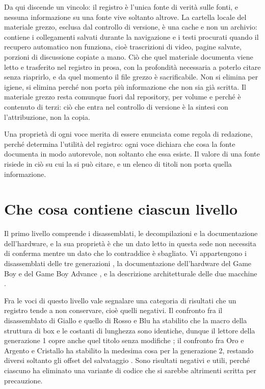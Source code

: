 Da qui discende un vincolo: il registro è l'unica fonte di verità sulle fonti, e nessuna informazione su una fonte vive soltanto altrove. La cartella locale del materiale grezzo, esclusa dal controllo di versione, è una cache e non un archivio: contiene i collegamenti salvati durante la navigazione e i testi procurati quando il recupero automatico non funziona, cioè trascrizioni di video, pagine salvate, porzioni di discussione copiate a mano. Ciò che quel materiale documenta viene letto e trasferito nel registro in prosa, con la profondità necessaria a poterlo citare senza riaprirlo, e da quel momento il file grezzo è sacrificabile. Non si elimina per igiene, si elimina perché non porta più informazione che non sia già scritta. Il materiale grezzo resta comunque fuori dal repository, per volume e perché è contenuto di terzi: ciò che entra nel controllo di versione è la sintesi con l'attribuzione, non la copia.

Una proprietà di ogni voce merita di essere enunciata come regola di redazione, perché determina l'utilità del registro: ogni voce dichiara che cosa la fonte documenta in modo autorevole, non soltanto che essa esiste. Il valore di una fonte risiede in ciò su cui la si può citare, e un elenco di titoli non porta quella informazione.

\section{Che cosa contiene ciascun livello}

Il primo livello comprende i disassemblati, le decompilazioni e la documentazione dell'hardware, e la sua proprietà è che un dato letto in questa sede non necessita di conferma mentre un dato che lo contraddice è sbagliato. Vi appartengono i disassemblati delle tre generazioni \cite{pokered,pokecrystal,pokeemerald,pokeruby,pokefirered}, la documentazione dell'hardware del Game Boy \cite{pandocs} e del Game Boy Advance \cite{gbatek}, e la descrizione architetturale delle due macchine \cite{copetti}.

Fra le voci di questo livello vale segnalare una categoria di risultati che un registro tende a non conservare, cioè quelli negativi. Il confronto fra il disassemblato di Giallo e quello di Rosso e Blu ha stabilito che la macro della struttura di box e le costanti di lunghezza sono identiche, dunque il lettore della generazione 1 copre anche quel titolo senza modifiche \cite{pokeyellow}; il confronto fra Oro e Argento e Cristallo ha stabilito la medesima cosa per la generazione 2, restando diversi soltanto gli offset del salvataggio \cite{pokegold}. Sono risultati negativi e utili, perché ciascuno ha eliminato una variante di codice che si sarebbe altrimenti scritta per precauzione.

